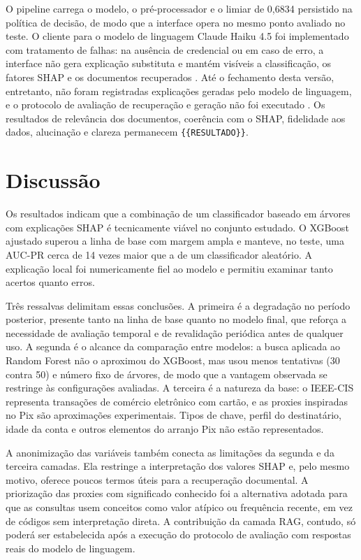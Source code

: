 O pipeline carrega o modelo, o pré-processador e o limiar de 0,6834 persistido na política de decisão, de modo que a interface opera no mesmo ponto avaliado no teste. O cliente para o modelo de linguagem Claude Haiku 4.5 foi implementado com tratamento de falhas: na ausência de credencial ou em caso de erro, a interface não gera explicação substituta e mantém visíveis a classificação, os fatores SHAP e os documentos recuperados \cite{lewis2020rag}. Até o fechamento desta versão, entretanto, não foram registradas explicações geradas pelo modelo de linguagem, e o protocolo de avaliação de recuperação e geração não foi executado \cite{es2024ragas}. Os resultados de relevância dos documentos, coerência com o SHAP, fidelidade aos dados, alucinação e clareza permanecem \texttt{\{\{RESULTADO\}\}}.

\section{Discussão}

Os resultados indicam que a combinação de um classificador baseado em árvores com explicações SHAP é tecnicamente viável no conjunto estudado. O XGBoost ajustado superou a linha de base com margem ampla e manteve, no teste, uma AUC-PR cerca de 14 vezes maior que a de um classificador aleatório. A explicação local foi numericamente fiel ao modelo e permitiu examinar tanto acertos quanto erros.

Três ressalvas delimitam essas conclusões. A primeira é a degradação no período posterior, presente tanto na linha de base quanto no modelo final, que reforça a necessidade de avaliação temporal e de revalidação periódica antes de qualquer uso. A segunda é o alcance da comparação entre modelos: a busca aplicada ao Random Forest não o aproximou do XGBoost, mas usou menos tentativas (30 contra 50) e número fixo de árvores, de modo que a vantagem observada se restringe às configurações avaliadas. A terceira é a natureza da base: o IEEE-CIS representa transações de comércio eletrônico com cartão, e as proxies inspiradas no Pix são aproximações experimentais. Tipos de chave, perfil do destinatário, idade da conta e outros elementos do arranjo Pix não estão representados.

A anonimização das variáveis também conecta as limitações da segunda e da terceira camadas. Ela restringe a interpretação dos valores SHAP e, pelo mesmo motivo, oferece poucos termos úteis para a recuperação documental. A priorização das proxies com significado conhecido foi a alternativa adotada para que as consultas usem conceitos como valor atípico ou frequência recente, em vez de códigos sem interpretação direta. A contribuição da camada RAG, contudo, só poderá ser estabelecida após a execução do protocolo de avaliação com respostas reais do modelo de linguagem.
